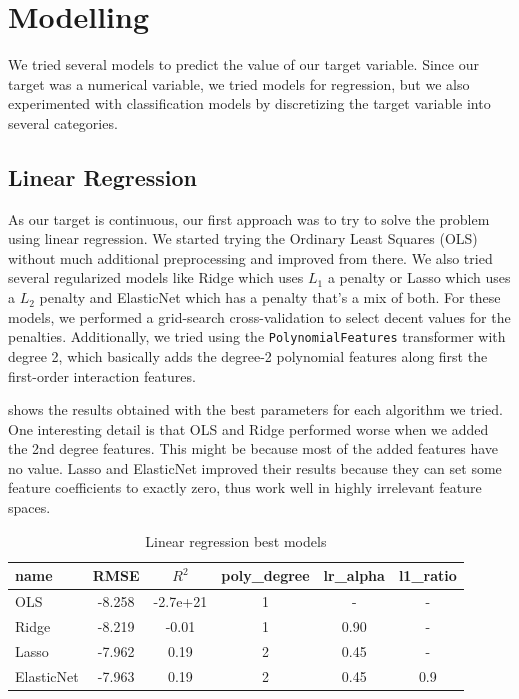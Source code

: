 \section{Modelling}%
\label{sub:results}

We tried several models to predict the value of our target variable. Since our target
was a numerical variable, we tried models for regression, but we also experimented with
classification models by discretizing the target variable into several categories.

\subsection{Linear Regression}%
\label{ssub:linear-regression}

As our target is continuous, our first approach was to try to solve the problem using linear regression. We started trying the Ordinary Least Squares (OLS) without much additional preprocessing and improved from there. We also tried several regularized models like Ridge which uses $L_1$ a penalty or Lasso which uses a $L_2$ penalty and ElasticNet which has a penalty that's a mix of both. For these models, we performed a grid-search cross-validation to select decent values for the penalties. Additionally, we tried using the \texttt{PolynomialFeatures} transformer with degree 2, which basically adds the degree-2 polynomial features along first the first-order interaction features.

 shows the results obtained with the best parameters for each algorithm we tried. One interesting detail is that OLS and Ridge performed worse when we added the 2nd degree features. This might be because most of the added features have no value.  Lasso and ElasticNet improved their results because they can set some feature coefficients to exactly zero, thus work well in highly irrelevant feature spaces. 

\begin{table}[H]
    \centering
    \begin{tabular}{lccccc}
        \toprule
        name & RMSE & $R^2$ & poly\_degree &  lr\_alpha &  l1\_ratio \\
        \midrule
        OLS & -8.258 & -2.7e+21 &       1 &        -   &        - \\
        Ridge & -8.219 &  -0.01 &        1 &       0.90 &        - \\
        Lasso & -7.962 &  0.19  &         2 &       0.45 &        - \\
        ElasticNet & -7.963 &  0.19 &      2 &       0.45 &      0.9 \\
        \bottomrule
    \end{tabular}
    \caption{Linear regression best models}
    \label{ml:lr}
\end{table}

